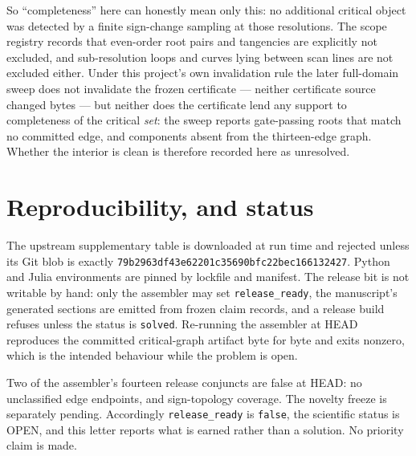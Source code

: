 \documentclass[11pt]{article}
\begin{document}
So ``completeness'' here can honestly mean only this: no additional critical object was detected by
a finite sign-change sampling at those resolutions. The scope registry records that even-order root
pairs and tangencies are explicitly not excluded, and sub-resolution loops and curves lying between
scan lines are not excluded either. Under this project's own invalidation rule the later full-domain
sweep does not invalidate the frozen certificate --- neither certificate source changed bytes --- but
neither does the certificate lend any support to completeness of the critical \emph{set}: the sweep
reports gate-passing roots that match no committed edge, and components absent from the thirteen-edge
graph. Whether the interior is clean is therefore recorded here as unresolved.

\section{Reproducibility, and status}

The upstream supplementary table is downloaded at run time and rejected unless its Git blob is
exactly \texttt{79b2963df43e62201c35690bfc22bec166132427}. Python and Julia environments are pinned
by lockfile and manifest. The release bit is not writable by hand: only the assembler may set
\texttt{release\_ready}, the manuscript's generated sections are emitted from frozen claim records,
and a release build refuses unless the status is \texttt{solved}. Re-running the assembler at HEAD
reproduces the committed critical-graph artifact byte for byte and exits nonzero, which is the
intended behaviour while the problem is open.

Two of the assembler's fourteen release conjuncts are false at HEAD: no unclassified edge endpoints,
and sign-topology coverage. The novelty freeze is separately pending. Accordingly
\texttt{release\_ready} is \texttt{false}, the scientific status is OPEN, and this letter reports
what is earned rather than a solution. No priority claim is made.



\end{document}
